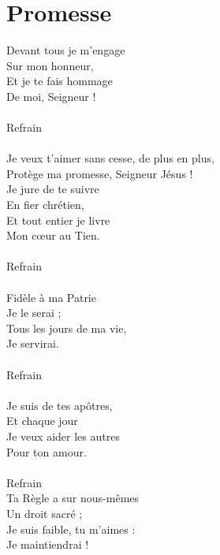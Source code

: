 \section*{Promesse}
Devant tous je m'engage\\
Sur mon honneur,\\
Et je te fais hommage\\
De moi, Seigneur !\\\\
Refrain\\\\
Je veux t'aimer sans cesse, de plus en plus,\\
Protège ma promesse, Seigneur Jésus !\\
Je jure de te suivre\\
En fier chrétien,\\
Et tout entier je livre\\
Mon cœur au Tien.\\\\
Refrain\\\\
Fidèle à ma Patrie\\
Je le serai ;\\
Tous les jours de ma vie,\\
Je servirai.\\\\
Refrain\\\\
Je suis de tes apôtres,\\
Et chaque jour\\
Je veux aider les autres\\
Pour ton amour.\\\\
Refrain\\
Ta Règle a sur nous-mêmes\\
Un droit sacré ;\\
Je suis faible, tu m'aimes :\\
Je maintiendrai !\\